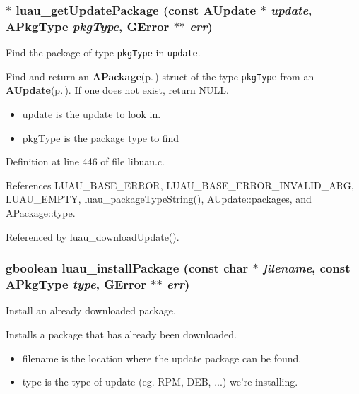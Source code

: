 \subsubsection{$\ast$ luau\_\-get\-Update\-Package (const {\bf AUpdate} $\ast$ {\em update}, {\bf APkg\-Type} {\em pkg\-Type}, GError $\ast$$\ast$ {\em err})}\label{libuau_8c_a17}


Find the package of type {\tt pkg\-Type} in {\tt update}. 

Find and return an {\bf APackage}{\rm (p.\,\pageref{structAPackage})} struct of the type {\tt pkg\-Type} from an {\bf AUpdate}{\rm (p.\,\pageref{structAUpdate})}. If one does not exist, return NULL.

\begin{itemize}
\item update is the update to look in. \item pkg\-Type is the package type to find 
\end{itemize}


Definition at line 446 of file libuau.c.

References LUAU\_\-BASE\_\-ERROR, LUAU\_\-BASE\_\-ERROR\_\-INVALID\_\-ARG, LUAU\_\-EMPTY, luau\_\-package\-Type\-String(), AUpdate::packages, and APackage::type.

Referenced by luau\_\-download\-Update().
\subsubsection{\setlength{\rightskip}{0pt plus 5cm}gboolean luau\_\-install\-Package (const char $\ast$ {\em filename}, const {\bf APkg\-Type} {\em type}, GError $\ast$$\ast$ {\em err})}\label{libuau_8c_a12}


Install an already downloaded package. 

Installs a package that has already been downloaded.

\begin{itemize}
\item filename is the location where the update package can be found. \item type is the type of update (eg. RPM, DEB, ...) we're installing. 
\end{itemize}


